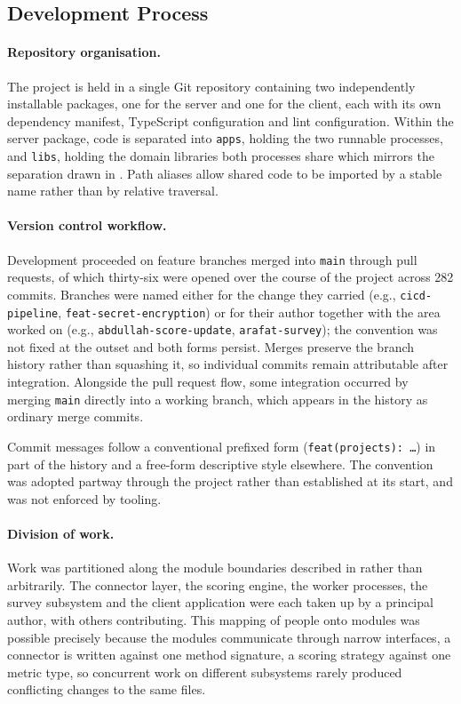 \subsection{Development Process}
\label{subsec:development-process}

\paragraph{Repository organisation.}
The project is held in a single Git repository containing two independently
installable packages, one for the server and one for the client, each with its
own dependency manifest, TypeScript configuration and lint configuration. Within
the server package, code is separated into \texttt{apps}, holding the two runnable
processes, and \texttt{libs}, holding the domain libraries both processes share which mirrors the separation drawn in . Path aliases allow shared
code to be imported by a stable name rather than by relative traversal.

\paragraph{Version control workflow.}
Development proceeded on feature branches merged into \texttt{main} through pull
requests, of which thirty-six were opened over the course of the project across
282 commits. Branches were named either for the change they carried
(e.g., \texttt{cicd-pipeline}, \texttt{feat-secret-encryption}) or for their author
together with the area worked on (e.g., \texttt{abdullah-score-update},
\texttt{arafat-survey}); the convention was not fixed at the outset and both
forms persist. Merges preserve the branch history rather than squashing it, so
individual commits remain attributable after integration. Alongside the pull
request flow, some integration occurred by merging \texttt{main} directly into a
working branch, which appears in the history as ordinary merge commits.

Commit messages follow a conventional prefixed form
(\texttt{feat(projects): \ldots}) in part of the history and a free-form
descriptive style elsewhere. The convention was adopted partway through the
project rather than established at its start, and was not enforced by tooling.

\paragraph{Division of work.}
Work was partitioned along the module boundaries described in
 rather than arbitrarily. The connector layer, the scoring
engine, the worker processes, the survey subsystem and the client application
were each taken up by a principal author, with others contributing. This mapping
of people onto modules was possible precisely because the modules communicate
through narrow interfaces, a connector is written against one method
signature, a scoring strategy against one metric type, so concurrent work on
different subsystems rarely produced conflicting changes to the same files.


